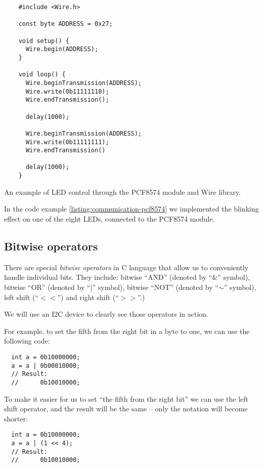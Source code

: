 \documentclass[../sparc.tex]{subfiles}
\begin{document}
\begin{listing}[H]
  \begin{verbatim}
    #include <Wire.h>

    const byte ADDRESS = 0x27;

    void setup() {
      Wire.begin(ADDRESS);
    }

    void loop() {
      Wire.beginTransmission(ADDRESS);
      Wire.write(0b11111110);
      Wire.endTransmission();

      delay(1000);

      Wire.beginTransmission(ADDRESS);
      Wire.write(0b11111111);
      Wire.endTransmission()

      delay(1000);
    }
  \end{verbatim}
  \label{listing:communication-pcf8574}
  \caption{An example of LED control through the PCF8574 module and Wire
    library.}
\end{listing}

In the code example \ref{listing:communication-pcf8574} we implemented the
blinking effect on one of the eight LEDs, connected to the PCF8574 module.

\subsection{Bitwise operators}

There are special \emph{bitwise operators} in C language that allow us to
conveniently handle individual bits.  They include: bitwise ``AND'' (denoted by
``\&'' symbol), bitwise ``OR'' (denoted by ``|'' symbol), bitwise ``NOT''
(denoted by ``$\sim$'' symbol), left shift (``$<<$'') and right shift (``$>>$''.)

We will use an I2C device to clearly see those operators in action.

For example, to set the fifth from the right bit in a byte to one, we can use
the following code:

\begin{verbatim}
  int a = 0b10000000;
  a = a | 0b00010000;
  // Result:
  //      0b10010000;
\end{verbatim}

To make it easier for us to set ``the fifth from the right bit'' we can use the
left shift operator, and the result will be the same -- only the notation will
become shorter:

\begin{verbatim}
  int a = 0b10000000;
  a = a | (1 << 4);
  // Result:
  //      0b10010000;
\end{verbatim}
\end{document}

